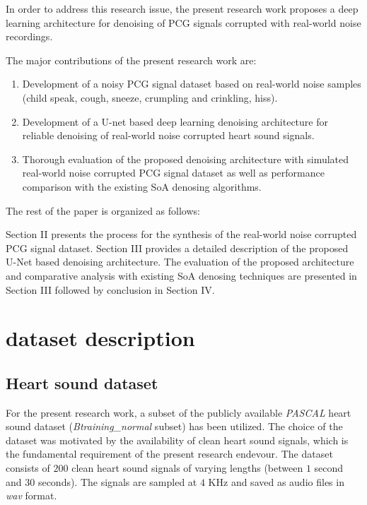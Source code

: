 \documentclass[sigconf,screen]{acmart}
\begin{document}
In order to address this research issue, the present research work proposes a deep learning architecture for denoising of PCG signals corrupted with real-world noise recordings.

The major contributions of the present research work are:
\begin{enumerate}
    \item Development of a noisy PCG signal dataset based on real-world noise samples (child speak, cough, sneeze, crumpling and crinkling, hiss).
    \item Development of a U-net based deep learning denoising architecture for reliable denoising of real-world noise corrupted heart sound signals.
    \item Thorough evaluation of the proposed denoising architecture with simulated real-world noise corrupted PCG signal dataset as well as performance comparison with the existing SoA denosing algorithms.
 
\end{enumerate}

The rest of the paper is organized as follows:

Section II presents the process for the synthesis of the real-world noise corrupted PCG signal dataset. Section III provides a detailed description of the proposed U-Net based denoising architecture. The evaluation of the proposed architecture and comparative analysis with existing SoA denosing techniques are presented in Section III followed by conclusion in Section IV.
\section{dataset description} 
\subsection{Heart sound dataset}
For the present research work, a subset of the publicly available \textit{PASCAL} heart sound dataset (\textit{Btraining\_normal} subset) \cite{pascal-chsc-2011} has been utilized. The choice of the dataset was motivated by the availability of clean heart sound signals, which is the fundamental requirement of the present research endevour. The dataset consists of $200$ clean heart sound signals of varying lengths (between $1$ second and $30$ seconds). The signals are sampled at $4$ KHz and saved as audio files in \textit{wav} format.
\end{document}
